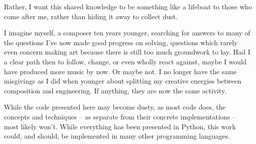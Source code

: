 \begin{markdown}
Rather, I want this shared knowledge to be something like a lifeboat to those
who come after me, rather than hiding it away to collect dust.

I imagine myself, a composer ten years younger, searching for answers to many
of the questions I've now made good progress on solving, questions which rarely
even concern making art because there is still too much groundwork to lay. Had
I a clear path then to follow, change, or even wholly react against,
maybe I would have produced more music by now. Or maybe not. I no longer have
the same misgivings as I did when younger about splitting my creative energies
between composition and engineering. If anything, they are now the same
activity.

While the code presented here may become dusty, as most code does, the
concepts and techniques -- as separate from their concrete implementations --
most likely won't. While everything has been presented in Python, this work
could, and should, be implemented in many other programming languages.

\end{markdown}